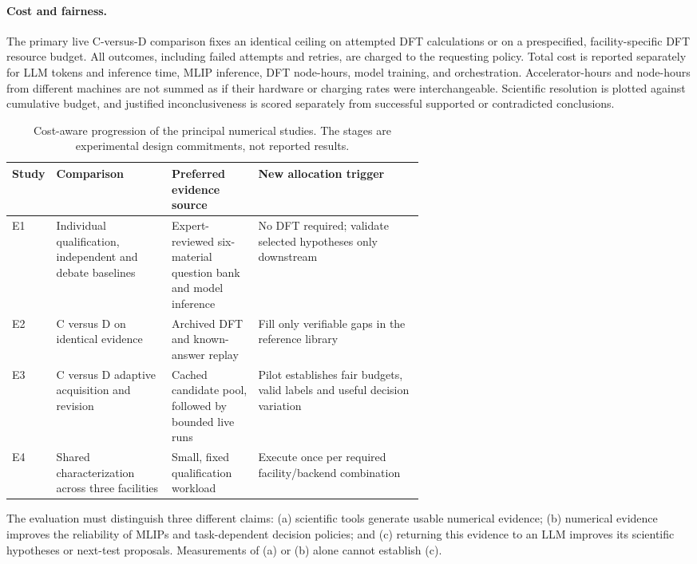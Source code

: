 \documentclass[11pt,a4paper]{article}
\begin{document}
\paragraph{Cost and fairness.}
The primary live C-versus-D comparison fixes an identical ceiling on attempted DFT calculations or on a prespecified, facility-specific DFT resource budget. All outcomes, including failed attempts and retries, are charged to the requesting policy. Total cost is reported separately for LLM tokens and inference time, MLIP inference, DFT node-hours, model training, and orchestration. Accelerator-hours and node-hours from different machines are not summed as if their hardware or charging rates were interchangeable. Scientific resolution is plotted against cumulative budget, and justified inconclusiveness is scored separately from successful supported or contradicted conclusions.

\begin{table}[htbp]
\centering\small
\caption{Cost-aware progression of the principal numerical studies. The stages are experimental design commitments, not reported results.}
\label{tab:allocation_priority}
\begin{tabularx}{\linewidth}{@{}p{0.10\linewidth}p{0.29\linewidth}p{0.21\linewidth}X@{}}
\toprule
Study & Comparison & Preferred evidence source & New allocation trigger \\
\midrule
E1 & Individual qualification, independent and debate baselines & Expert-reviewed six-material question bank and model inference & No DFT required; validate selected hypotheses only downstream \\
E2 & C versus D on identical evidence & Archived DFT and known-answer replay & Fill only verifiable gaps in the reference library \\
E3 & C versus D adaptive acquisition and revision & Cached candidate pool, followed by bounded live runs & Pilot establishes fair budgets, valid labels and useful decision variation \\
E4 & Shared characterization across three facilities & Small, fixed qualification workload & Execute once per required facility/backend combination \\
\bottomrule
\end{tabularx}
\end{table}
The evaluation must distinguish three different claims: (a) scientific tools generate usable numerical evidence; (b) numerical evidence improves the reliability of MLIPs and task-dependent decision policies; and (c) returning this evidence to an LLM improves its scientific hypotheses or next-test proposals. Measurements of (a) or (b) alone cannot establish (c).
\end{document}
